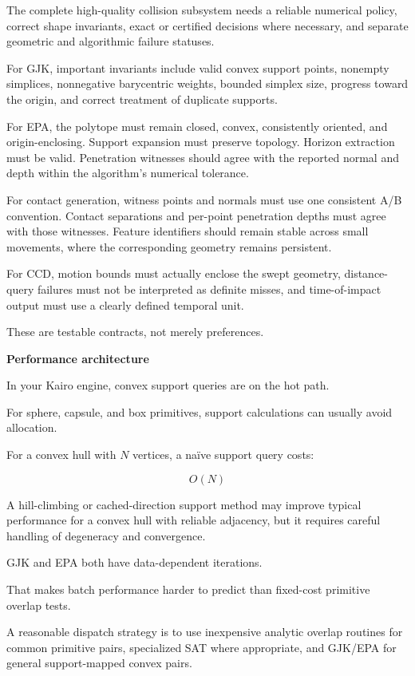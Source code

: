 The complete high-quality collision subsystem needs a reliable numerical policy, correct shape invariants, exact or certified decisions where necessary, and separate geometric and algorithmic failure statuses.

For GJK, important invariants include valid convex support points, nonempty simplices, nonnegative barycentric weights, bounded simplex size, progress toward the origin, and correct treatment of duplicate supports.

For EPA, the polytope must remain closed, convex, consistently oriented, and origin-enclosing. Support expansion must preserve topology. Horizon extraction must be valid. Penetration witnesses should agree with the reported normal and depth within the algorithm's numerical tolerance.

For contact generation, witness points and normals must use one consistent A/B convention. Contact separations and per-point penetration depths must agree with those witnesses. Feature identifiers should remain stable across small movements, where the corresponding geometry remains persistent.

For CCD, motion bounds must actually enclose the swept geometry, distance-query failures must not be interpreted as definite misses, and time-of-impact output must use a clearly defined temporal unit.

These are testable contracts, not merely preferences.

\textbf{Performance architecture}

In your Kairo engine, convex support queries are on the hot path.

For sphere, capsule, and box primitives, support calculations can usually avoid allocation.

For a convex hull with \(N\) vertices, a naïve support query costs:

\[
O(N)
\]

A hill-climbing or cached-direction support method may improve typical performance for a convex hull with reliable adjacency, but it requires careful handling of degeneracy and convergence.

GJK and EPA both have data-dependent iterations.

That makes batch performance harder to predict than fixed-cost primitive overlap tests.

A reasonable dispatch strategy is to use inexpensive analytic overlap routines for common primitive pairs, specialized SAT where appropriate, and GJK/EPA for general support-mapped convex pairs.

